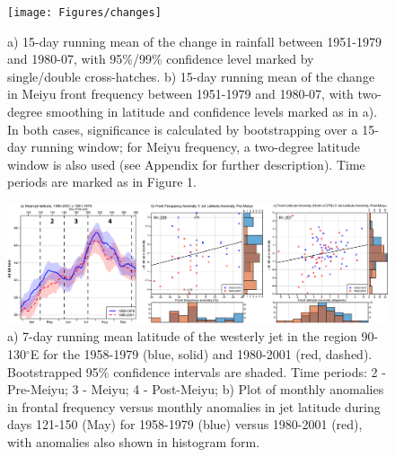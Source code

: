 \documentclass[draft,grl]{AGUTeX}
\begin{document}
\begin{figure}[htbp]
\begin{center}
\texttt{[image: Figures/changes]}
\caption{a) 15-day running mean of the change in rainfall between 1951-1979 and 1980-07, with 95\%/99\% confidence level marked by single/double cross-hatches. b) 15-day running mean of the change in Meiyu front frequency between 1951-1979 and 1980-07, with two-degree smoothing in latitude and confidence levels marked as in a). In both cases, significance is calculated by bootstrapping over a 15-day running window; for Meiyu frequency, a two-degree latitude window is also used (see Appendix for further description). Time periods are marked as in Figure 1.}
\label{changes}
\end{center}
\end{figure}

\begin{figure}[htbp]
\begin{center}
\includegraphics[width=36pc]{Figures/jet}
\caption{a) 7-day running mean latitude of the westerly jet in the region 90-130$^\circ$E for the 1958-1979 (blue, solid) and 1980-2001 (red, dashed). Bootstrapped 95\% confidence intervals are shaded. Time periods: 2 - Pre-Meiyu; 3 - Meiyu; 4 - Post-Meiyu; b) Plot of monthly anomalies in frontal frequency versus monthly anomalies in jet latitude during days 121-150 (May) for 1958-1979 (blue) versus 1980-2001 (red), with anomalies also shown in histogram form.}
\label{jet_seasonal}
\end{center}
\end{figure}
\end{document}
